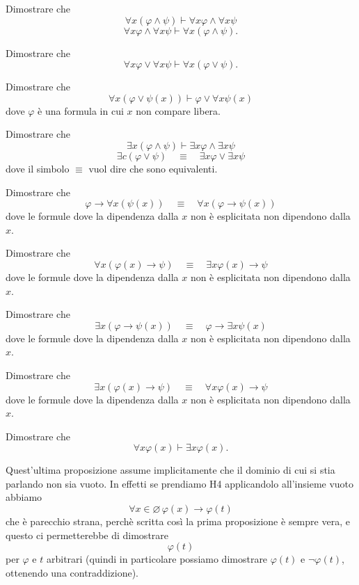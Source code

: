 \documentclass[11pt]{scrartcl}
\begin{document}
	\begin{problem}
		Dimostrare che 
		$$\forall x (\varphi \land \psi) \vdash \forall x \varphi \land \forall x \psi $$
		$$\forall x \varphi \land \forall x \psi  \vdash \forall x (\varphi \land \psi).$$
	\end{problem}
	\begin{problem}
		Dimostrare che 
		$$\forall x \varphi \lor \forall x \psi \vdash \forall x \left(\varphi \lor \psi\right).$$
	\end{problem}
	\begin{problem}
		Dimostrare che 
		$$\forall x \left(\varphi \lor \psi (x)\right)\vdash \varphi \lor \forall x \psi(x)$$
		dove $\varphi$ è una formula in cui $x$ non compare libera.
	\end{problem}
	\begin{problem}
		Dimostrare che
		$$\exists x \left(\varphi \land \psi\right)\vdash \exists x \varphi \land \exists x \psi$$
		$$\exists c \left(\varphi \lor \psi\right)\quad \equiv \quad \exists x \varphi \lor \exists x \psi$$
		dove il simbolo $\equiv$ vuol dire che sono equivalenti. 
	\end{problem}
	
	\begin{problem}
		Dimostrare che 
		$$\varphi \to \forall x \left(\psi (x)\right) \quad \equiv \quad \forall x \left(\varphi \to \psi (x)\right)$$
		dove le formule dove la dipendenza dalla $x$ non è esplicitata non dipendono dalla $x$.
	\end{problem}
	\begin{problem}
		Dimostrare che 
		$$\forall x \left(\varphi(x)\to \psi \right)\quad \equiv \quad \exists x \varphi(x)\to \psi$$
		dove le formule dove la dipendenza dalla $x$ non è esplicitata non dipendono dalla $x$.
	\end{problem}
	\begin{problem}
		Dimostrare che
		$$\exists x \left(\varphi \to \psi (x)\right) \quad \equiv \quad \varphi \to \exists x \psi (x)$$
		dove le formule dove la dipendenza dalla $x$ non è esplicitata non dipendono dalla $x$.
	\end{problem}
	\begin{problem}
		Dimostrare che
		$$\exists x \left(\varphi(x)\to \psi\right) \quad \equiv \quad \forall x \varphi(x) \to \psi$$
		dove le formule dove la dipendenza dalla $x$ non è esplicitata non dipendono dalla $x$.
	\end{problem}
	\begin{problem}
		Dimostrare che
		$$\forall x \varphi(x)\vdash \exists x \varphi (x).$$
	\end{problem}
	\begin{remark}
		Quest'ultima proposizione assume implicitamente che il dominio di cui si stia parlando non sia vuoto. In effetti se prendiamo H4 applicandolo all'insieme vuoto abbiamo
		$$\forall x \in \varnothing \, \varphi(x) \to \varphi(t)$$
		che è parecchio strana, perchè scritta così la prima proposizione è sempre vera, e questo ci permetterebbe di dimostrare 
		$$\varphi(t)$$
		per $\varphi$ e $t$ arbitrari (quindi in particolare possiamo dimostrare $\varphi(t)$ e $\lnot \varphi(t)$, ottenendo una contraddizione). 
	\end{remark}
	
\end{document}
